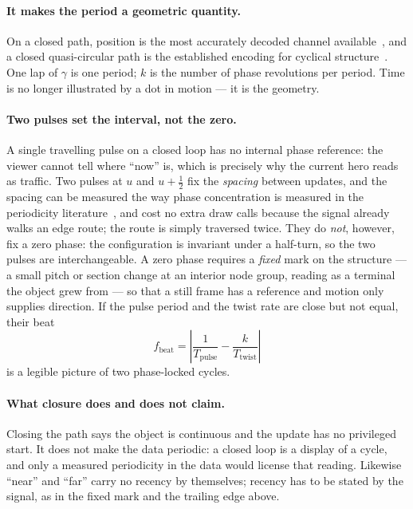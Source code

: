 \documentclass[11pt,a4paper]{article}
\theoremstyle{definition}
\begin{document}
\paragraph{It makes the period a geometric quantity.} On a closed path,
position is the most accurately decoded channel available~\cite{cleveland1984},
and a closed quasi-circular path is the established encoding for cyclical
structure~\cite{franke2023,rakuschek2026}. One lap of $\gamma$ is one period;
$k$ is the number of phase revolutions per period. Time is no longer
illustrated by a dot in motion --- it is the geometry.

\paragraph{Two pulses set the interval, not the zero.} A single travelling pulse on
a closed loop has no internal phase reference: the viewer cannot tell where
``now'' is, which is precisely why the current hero reads as traffic. Two
pulses at $u$ and $u+\tfrac12$ fix the \emph{spacing} between updates, and the
spacing can be measured the way phase
concentration is measured in the periodicity
literature~\cite{franke2023}, and cost no extra draw calls because the signal
already walks an edge route; the route is simply traversed twice. They do
\emph{not}, however, fix a zero phase: the configuration is invariant under a
half-turn, so the two pulses are interchangeable. A zero phase requires a
\emph{fixed} mark on the structure --- a small pitch or section change at an
interior node group, reading as a terminal the object grew from --- so that a
still frame has a reference and motion only supplies direction. If the pulse
period and the twist rate are close but not equal, their beat
\begin{equation}
\label{eq:beat}
f_{\mathrm{beat}}=\left|\frac{1}{T_{\mathrm{pulse}}}-\frac{k}{T_{\mathrm{twist}}}\right|
\end{equation}
is a legible picture of two phase-locked cycles.

\paragraph{What closure does and does not claim.} Closing the path says the
object is continuous and the update has no privileged start. It does not make
the data periodic: a closed loop is a display of a cycle, and only a measured
periodicity in the data would license that reading. Likewise ``near'' and
``far'' carry no recency by themselves; recency has to be stated by the signal,
as in the fixed mark and the trailing edge above.
\end{document}

